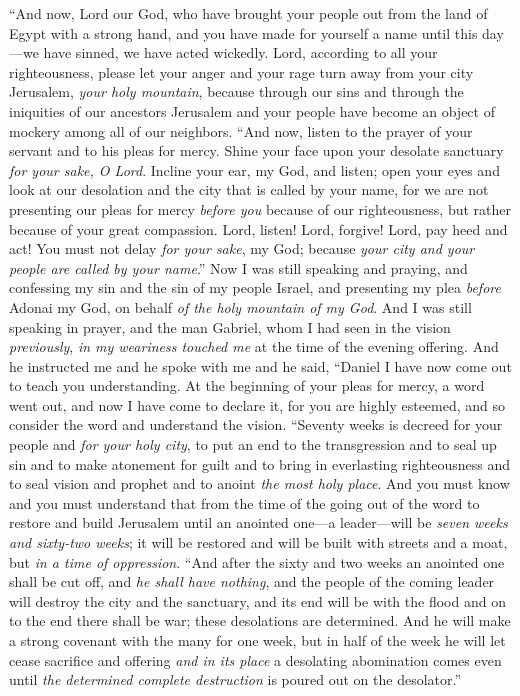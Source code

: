 \begin{biblechapter}
\verse “And now, Lord our God, who have brought your people out from the land of Egypt with a strong hand, and you have made for yourself a name until this day—we have sinned, we have acted wickedly.
\verse Lord, according to all your righteousness, please let your anger and your rage turn away from your city Jerusalem, \textit{your holy mountain}, because through our sins and through the iniquities of our ancestors Jerusalem and your people have become an object of mockery among all of our neighbors.
\verse “And now, listen to the prayer of your servant and to his pleas for mercy. Shine your face upon your desolate sanctuary \textit{for your sake, O Lord}.
\verse Incline your ear, my God, and listen; open your eyes and look at our desolation and the city that is called by your name, for we are not presenting our pleas for mercy \textit{before you} because of our righteousness, but rather because of your great compassion.
\verse Lord, listen! Lord, forgive! Lord, pay heed and act! You must not delay \textit{for your sake}, my God; because \textit{your city and your people are called by your name}.”
 Now I was still speaking and praying, and confessing my sin and the sin of my people Israel, and presenting my plea \textit{before} Adonai my God, on behalf \textit{of the holy mountain of my God}.
\verse And I was still speaking in prayer, and the man Gabriel, whom I had seen in the vision \textit{previously}, \textit{in my weariness touched me} at the time of the evening offering.
\verse And he instructed me and he spoke with me and he said, “Daniel I have now come out to teach you understanding.
\verse At the beginning of your pleas for mercy, a word went out, and now I have come to declare it, for you are highly esteemed, and so consider the word and understand the vision.
 “Seventy weeks is decreed for your people and \textit{for your holy city}, to put an end to the transgression and to seal up sin and to make atonement for guilt and to bring in everlasting righteousness and to seal vision and prophet and to anoint \textit{the most holy place}.
\verse And you must know and you must understand that from the time of the going out of the word to restore and build Jerusalem until an anointed one—a leader—will be \textit{seven weeks and sixty-two weeks}; it will be restored and will be built with streets and a moat, but \textit{in a time of oppression}.
\verse “And after the sixty and two weeks an anointed one shall be cut off, and \textit{he shall have nothing}, and the people of the coming leader will destroy the city and the sanctuary, and its end will be with the flood and on to the end there shall be war; these desolations are determined.
\verse And he will make a strong covenant with the many for one week, but in half of the week he will let cease sacrifice and offering \textit{and in its place} a desolating abomination comes even until \textit{the determined complete destruction} is poured out on the desolator.”
\end{biblechapter}

